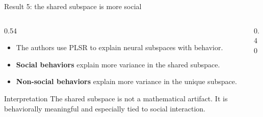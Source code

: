 \documentclass[aspectratio=169,11pt]{beamer}
\begin{document}
\begin{frame}{Result 5: the shared subspace is more social}
\begin{columns}[T]
  \begin{column}{0.54\textwidth}
    \begin{itemize}
      \item The authors use PLSR to explain neural subspaces with behavior.
      \item \textbf{Social behaviors} explain more variance in the shared subspace.
      \item \textbf{Non-social behaviors} explain more variance in the unique subspace.
    \end{itemize}
    \begin{block}{Interpretation}
    The shared subspace is not a mathematical artifact. It is behaviorally meaningful and especially tied to social interaction.
    \end{block}
  \end{column}
  \begin{column}{0.40\textwidth}
    \begin{center}
    \end{center}
  \end{column}
\end{columns}
\end{frame}
\end{document}
